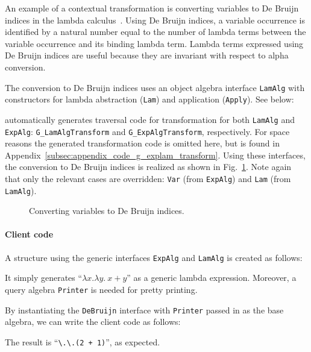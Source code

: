 An example of a contextual transformation is converting variables to De Bruijn indices in the lambda calculus~\cite{deBruijn1972381}.
Using De Bruijn indices, a variable occurrence is identified by a natural number equal to the number of lambda terms between the variable occurrence and its binding lambda term.
Lambda terms expressed using De Bruijn indices are useful because they are invariant with respect to alpha conversion.

The conversion to De Bruijn indices uses an object algebra interface
\lstinline{LamAlg} with constructors for lambda abstraction
(\lstinline{Lam}) and application (\lstinline{Apply}). See below:


\name automatically generates traversal code for transformation for both
\lstinline{LamAlg} and \lstinline{ExpAlg}:
\lstinline{G_LamAlgTransform} and \lstinline{G_ExpAlgTransform},
respectively. For space reasons
the generated transformation code is omitted here, but is found
in Appendix~\ref{subsec:appendix_code_g_explam_transform}. Using these
interfaces, the conversion to De Bruijn indices is
  realized as shown in Fig.~\ref{DeBruijn}. Note again that only the
  relevant cases are overridden: \lstinline{Var} (from
  \lstinline{ExpAlg}) and \lstinline{Lam} (from \lstinline{LamAlg}).


\begin{figure}[t]
\nocaptionrule
\caption{Converting variables to De Bruijn indices.}
\label{DeBruijn}
\end{figure}

\paragraph{Client code} A structure using the generic interfaces
\lstinline{ExpAlg} and \lstinline{LamAlg} is created as follows:


It simply generates ``$\lambda x.\lambda y.~x+y$'' as a generic lambda expression.
Moreover, a query algebra \lstinline{Printer} is needed for pretty printing.


By instantiating the \lstinline{DeBruijn} interface with \lstinline{Printer} passed
in as the base algebra, we can write the client code as follows:


The result is ``\lstinline{\.\.(2 + 1)}'', as expected.
